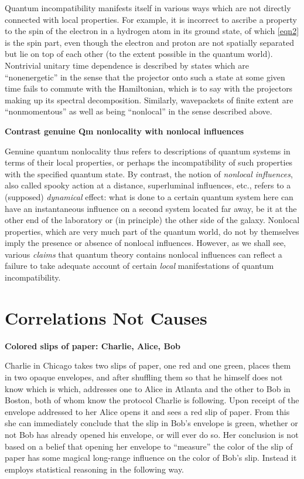 \documentclass[10pt]{article} %
\def\outl#1{\par{\medskip\noindent\hspace*{.5cm}\bf
      \mathversion{bold}#1\mathversion{normal}\smallskip} }
\def\np{} \def\xa{} \def\xb{} \def\xn{} \def\xp{}
\def\outl#1{} \def\np{} \def\xa{} \def\xb{} \def\xn{} \def\xp{}
\def\outl#1{\par{\medskip\noindent\hspace*{.5cm}\bf
      \mathversion{bold}#1\mathversion{normal}\smallskip} }
\def\np{\newpage }\def\xn{\nopagebreak }\def\xp{\pagebreak }
\begin{document}
Quantum incompatibility manifests itself in various ways which are not directly
connected with local properties.  For example, it is incorrect to ascribe a
property to the spin of the electron in a hydrogen atom in its ground state,
of which \eqref{eqn2} is the spin part, even though the electron and proton
are not spatially separated but lie on top of each other (to the extent
possible in the quantum world).  Nontrivial unitary time dependence is
described by states which are ``nonenergetic'' in the sense that the projector
onto such a state at some given time fails to commute with the Hamiltonian,
which is to say with the projectors making up its spectral
decomposition. Similarly, wavepackets of finite extent are ``nonmomentous'' as
well as being ``nonlocal'' in the sense described above.

\xb
\outl{Contrast genuine Qm nonlocality with nonlocal influences}
\xa

Genuine quantum nonlocality thus refers to descriptions of quantum systems in
terms of their local properties, or perhaps the incompatibility of such
properties with the specified quantum state.  By contrast, the notion of
\emph{nonlocal influences}, also called spooky action at a distance,
superluminal influences, etc., refers to a (supposed) \emph{dynamical} effect:
what is done to a certain quantum system here can have an instantaneous
influence on a second system located far away, be it at the other end of the
laboratory or (in principle) the other side of the galaxy.  Nonlocal
properties, which are very much part of the quantum world, do not by
themselves imply the presence or absence of nonlocal influences.  However, as
we shall see, various \emph{claims} that quantum theory contains nonlocal
influences can reflect a failure to take adequate account of certain
\emph{local} manifestations of quantum incompatibility.

\xb
\section{Correlations Not Causes}
\label{sct3}
\xa

\xb
\outl{Colored slips of paper: Charlie, Alice, Bob}
\xa



Charlie in Chicago takes two slips of paper, one red and one green, places
them in two opaque envelopes, and after shuffling them so that he himself does
not know which is which, addresses one to Alice in Atlanta and the other to
Bob in Boston, both of whom know the protocol Charlie is following.  Upon
receipt of the envelope addressed to her Alice opens it and sees a red slip of
paper.  From this she can immediately conclude that the slip in Bob's envelope
is green, whether or not Bob has already opened his envelope, or will ever do
so. Her conclusion is not based on a belief that opening her envelope to
``measure'' the color of the slip of paper has some magical long-range
influence on the color of Bob's slip.  Instead it employs statistical
reasoning in the following way.
\end{document}
